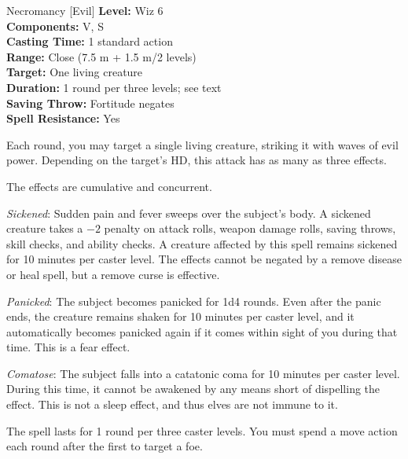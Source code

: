 {Necromancy [Evil]}
{
	\textbf{Level:}
	Wiz 6\\
	\textbf{Components:}
	V, S\\
	\textbf{Casting Time:}
	1 standard action\\
	\textbf{Range:}
	Close (7.5 m + 1.5 m/2 levels)\\
	\textbf{Target:}
	One living creature\\
	\textbf{Duration:}
	1 round per three levels; see text\\
	\textbf{Saving Throw:}
	Fortitude negates\\
	\textbf{Spell Resistance:}
	Yes\\
}
{
	Each round, you may target a single living creature, striking it with waves of evil power. Depending on the target's HD, this attack has as many as three effects.

	The effects are cumulative and concurrent.

	\textit{Sickened}:
	Sudden pain and fever sweeps over the subject's body. A sickened creature takes a $-2$ penalty on attack rolls, weapon damage rolls, saving throws, skill checks, and ability checks. A creature affected by this spell remains sickened for 10 minutes per caster level. The effects cannot be negated by a remove disease or heal spell, but a remove curse is effective.

	\textit{Panicked}:
	The subject becomes panicked for 1d4 rounds. Even after the panic ends, the creature remains shaken for 10 minutes per caster level, and it automatically becomes panicked again if it comes within sight of you during that time. This is a fear effect.

	\textit{Comatose}:
	The subject falls into a catatonic coma for 10 minutes per caster level. During this time, it cannot be awakened by any means short of dispelling the effect. This is not a sleep effect, and thus elves are not immune to it.

	The spell lasts for 1 round per three caster levels. You must spend a move action each round after the first to target a foe.

}
